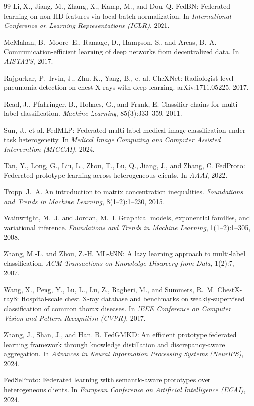 \documentclass[11pt,a4paper]{article}
\theoremstyle{definition}
\begin{document}
\begin{thebibliography}{99}
Li, X., Jiang, M., Zhang, X., Kamp, M., and Dou, Q.
\newblock FedBN: Federated learning on non-IID features via local batch normalization.
\newblock In \emph{International Conference on Learning Representations (ICLR)}, 2021.

McMahan, B., Moore, E., Ramage, D., Hampson, S., and Arcas, B.~A.
\newblock Communication-efficient learning of deep networks from decentralized data.
\newblock In \emph{AISTATS}, 2017.

Rajpurkar, P., Irvin, J., Zhu, K., Yang, B., et al.
\newblock CheXNet: Radiologist-level pneumonia detection on chest X-rays with deep learning.
\newblock arXiv:1711.05225, 2017.

Read, J., Pfahringer, B., Holmes, G., and Frank, E.
\newblock Classifier chains for multi-label classification.
\newblock \emph{Machine Learning}, 85(3):333--359, 2011.

Sun, J., et al.
\newblock FedMLP: Federated multi-label medical image classification under task heterogeneity.
\newblock In \emph{Medical Image Computing and Computer Assisted Intervention (MICCAI)}, 2024.

Tan, Y., Long, G., Liu, L., Zhou, T., Lu, Q., Jiang, J., and Zhang, C.
\newblock FedProto: Federated prototype learning across heterogeneous clients.
\newblock In \emph{AAAI}, 2022.

Tropp, J.~A.
\newblock An introduction to matrix concentration inequalities.
\newblock \emph{Foundations and Trends in Machine Learning}, 8(1--2):1--230, 2015.

Wainwright, M.~J. and Jordan, M.~I.
\newblock Graphical models, exponential families, and variational inference.
\newblock \emph{Foundations and Trends in Machine Learning}, 1(1--2):1--305, 2008.

Zhang, M.-L. and Zhou, Z.-H.
\newblock ML-$k$NN: A lazy learning approach to multi-label classification.
\newblock \emph{ACM Transactions on Knowledge Discovery from Data}, 1(2):7, 2007.

Wang, X., Peng, Y., Lu, L., Lu, Z., Bagheri, M., and Summers, R.~M.
\newblock ChestX-ray8: Hospital-scale chest X-ray database and benchmarks on weakly-supervised classification of common thorax diseases.
\newblock In \emph{IEEE Conference on Computer Vision and Pattern Recognition (CVPR)}, 2017.

Zhang, J., Shan, J., and Han, B.
\newblock FedGMKD: An efficient prototype federated learning framework through knowledge distillation and discrepancy-aware aggregation.
\newblock In \emph{Advances in Neural Information Processing Systems (NeurIPS)}, 2024.

FedSeProto: Federated learning with semantic-aware prototypes over heterogeneous clients.
\newblock In \emph{European Conference on Artificial Intelligence (ECAI)}, 2024.

\end{thebibliography}
\end{document}
